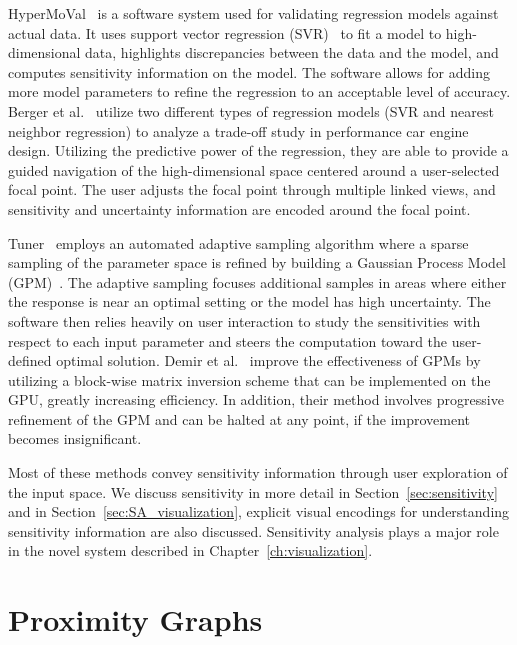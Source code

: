 HyperMoVal~\cite{PiringerBergerKrasser2010} is a software system used for validating regression models against actual data.
%
It uses support vector regression (SVR)~\cite{SmolaScholkopf2004} to fit a model to high-dimensional data, highlights discrepancies between the data and the model, and computes sensitivity information on the model.
%
The software allows for adding more model parameters to refine the regression to an acceptable level of accuracy.
%
Berger et al.~\cite{BergerPiringerFilzmoser2011} utilize two different types of regression models (SVR and nearest neighbor regression) to analyze a trade-off study in performance car engine design.
%
Utilizing the predictive power of the regression, they are able to provide a guided navigation of the high-dimensional space centered around a user-selected focal point.
%
The user adjusts the focal point through multiple linked views, and sensitivity and uncertainty information are encoded around the focal point.

Tuner~\cite{Torsney-WeirSaadMoller2011} employs an automated adaptive sampling algorithm where a sparse sampling of the parameter space is refined by building a Gaussian Process Model (GPM)~\cite{RasmussenWilliams2006}.
%
The adaptive sampling focuses additional samples in areas where either the response is near an optimal setting or the model has high uncertainty.
%
The software then relies heavily on user interaction to study the sensitivities with respect to each input parameter and steers the computation toward the user-defined optimal solution.
%
Demir et al.~\cite{DemirWestermann2013} improve the effectiveness of GPMs by utilizing a block-wise matrix inversion scheme that can be implemented on the GPU, greatly increasing efficiency.
%
In addition, their method involves progressive refinement of the GPM and can be halted at any point, if the improvement becomes insignificant.

Most of these methods convey sensitivity information through user exploration of the input space.
%
We discuss sensitivity in more detail in Section~\ref{sec:sensitivity} and in Section~\ref{sec:SA_visualization}, explicit visual encodings for understanding sensitivity information are also discussed.
%
Sensitivity analysis plays a major role in the novel system described in Chapter~\ref{ch:visualization}.

\section{Proximity Graphs}
\label{sec:graphs}

